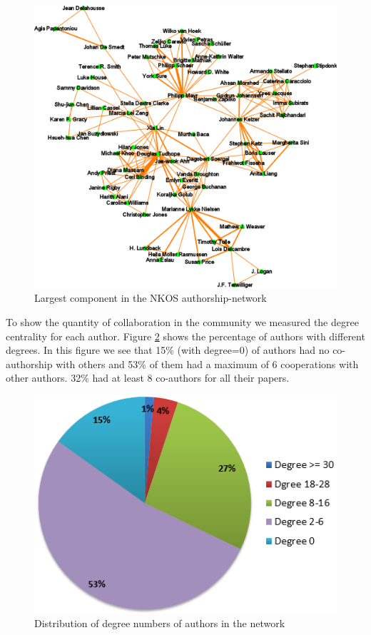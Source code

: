 \documentclass[runningheads,a4paper]{llncs}
\begin{document}
\begin{figure}[H]
	\centering
	\includegraphics[width=0.9\linewidth]{largestComponent}
	\caption{Largest component in the NKOS authorship-network}
	\label{fig:largestComponent}
\end{figure}

To show the quantity of collaboration in the community we measured the degree centrality for each author. Figure \ref{fig:degreePercentage} shows the percentage of authors with different degrees. In this figure we see that 15\% (with degree=0) of authors had no co-authorship with others and 53\% of them had a maximum of 6 cooperations with other authors. 32\% had at least 8 co-authors for all their papers.


\begin{figure}[H]
	\centering
	\includegraphics[width=0.6\linewidth]{degreePercentage}
	\caption{Distribution of degree numbers of authors in the network} 
	\label{fig:degreePercentage}
\end{figure}
\end{document}
